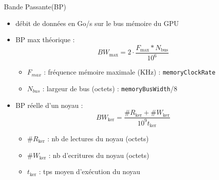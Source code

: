 \documentclass[11pt,mathserif]{beamer}
\begin{document}
\begin{frame}{Bande Passante(BP)}
  \begin{itemize}[<+->]
    \item débit de données en Go/s sur le bus mémoire du GPU 
    \item BP max théorique : $$BW_{\mbox{max}} = 2 \cdot \frac{F_{\mbox{max}} * N_{\mbox{bus}}}{10^6} $$
      \begin{itemize}
        \item $F_{max}$ : fréquence mémoire maximale (KHz) : \texttt{memoryClockRate}
        \item $N_{bus}$ : largeur de bus (octets) : \texttt{memoryBusWidth}/8
      \end{itemize}
    \item BP réelle d'un noyau : $$ BW_{\mbox{ker}} = \frac{\# R_{\ker} + \# W_{\ker}}{10^9 t_{\ker}} $$
      \begin{itemize}
        \item $\# R_{\ker}$ : nb de lectures du noyau (octets)
        \item $\# W_{\ker}$ : nb d'ecritures du noyau (octets)
        \item $t_{\ker}$ : tps moyen d'exécution du noyau
      \end{itemize}
  \end{itemize}
\end{frame}
\end{document}
